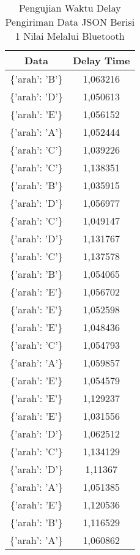 \begin{table}[!h]
\centering
  \caption{Pengujian Waktu Delay Pengiriman Data JSON Berisi 1 Nilai Melalui Bluetooth}
  \label{tbl:delayBluetoothJSON1}
  \begin{tabular}{|c|c|}
  \hline
  Data               & Delay Time  \\ \hline
  \{'arah': 'B'\}    & 1,063216    \\ \hline
  \{'arah': 'D'\}    & 1,050613    \\ \hline
  \{'arah': 'E'\}    & 1,056152    \\ \hline
  \{'arah': 'A'\}    & 1,052444    \\ \hline
  \{'arah': 'C'\}    & 1,039226    \\ \hline
  \{'arah': 'C'\}    & 1,138351    \\ \hline
  \{'arah': 'B'\}    & 1,035915    \\ \hline
  \{'arah': 'D'\}    & 1,056977    \\ \hline
  \{'arah': 'C'\}    & 1,049147    \\ \hline
  \{'arah': 'D'\}    & 1,131767    \\ \hline
  \{'arah': 'C'\}    & 1,137578    \\ \hline
  \{'arah': 'B'\}    & 1,054065    \\ \hline
  \{'arah': 'E'\}    & 1,056702    \\ \hline
  \{'arah': 'E'\}    & 1,052598    \\ \hline
  \{'arah': 'E'\}    & 1,048436    \\ \hline
  \{'arah': 'C'\}    & 1,054793    \\ \hline
  \{'arah': 'A'\}    & 1,059857    \\ \hline
  \{'arah': 'E'\}    & 1,054579    \\ \hline
  \{'arah': 'E'\}    & 1,129237    \\ \hline
  \{'arah': 'E'\}    & 1,031556    \\ \hline
  \{'arah': 'D'\}    & 1,062512    \\ \hline
  \{'arah': 'C'\}    & 1,134129    \\ \hline
  \{'arah': 'D'\}    & 1,11367     \\ \hline
  \{'arah': 'A'\}    & 1,051385    \\ \hline
  \{'arah': 'E'\}    & 1,120536    \\ \hline
  \{'arah': 'B'\}    & 1,116529    \\ \hline
  \{'arah': 'A'\}    & 1,060862    \\ \hline

\end{tabular}
\end{table}
